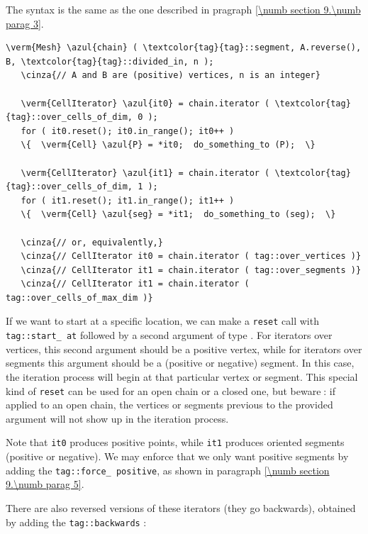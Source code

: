 The syntax is the same as the one described in pragraph \ref{\numb section 9.\numb parag 3}.

\begin{Verbatim}[commandchars=\\\{\},formatcom=\small\tt,
   baselinestretch=0.94,framesep=2mm                      ]
   \verm{Mesh} \azul{chain} ( \textcolor{tag}{tag}::segment, A.reverse(), B, \textcolor{tag}{tag}::divided_in, n );
   \cinza{// A and B are (positive) vertices, n is an integer}
   
   \verm{CellIterator} \azul{it0} = chain.iterator ( \textcolor{tag}{tag}::over_cells_of_dim, 0 );
   for ( it0.reset(); it0.in_range(); it0++ )
   \{  \verm{Cell} \azul{P} = *it0;  do_something_to (P);  \}

   \verm{CellIterator} \azul{it1} = chain.iterator ( \textcolor{tag}{tag}::over_cells_of_dim, 1 );
   for ( it1.reset(); it1.in_range(); it1++ )
   \{  \verm{Cell} \azul{seg} = *it1;  do_something_to (seg);  \}
   
   \cinza{// or, equivalently,}
   \cinza{// CellIterator it0 = chain.iterator ( tag::over_vertices )}
   \cinza{// CellIterator it1 = chain.iterator ( tag::over_segments )}
   \cinza{// CellIterator it1 = chain.iterator ( tag::over_cells_of_max_dim )}
\end{Verbatim}

If we want to start at a specific location, we can make a {\small\tt reset} call with
{\small\tt \textcolor{tag}{tag}::start\_\,at} followed by a second argument of type {\small\tt{}}.
For iterators over vertices, this second argument should be a positive vertex,
while for iterators over segments this argument should be a (positive or negative) segment.
In this case, the iteration process will begin at that particular vertex or segment.
This special kind of {\small\tt reset} can be used for an open chain or a closed one,
but beware$\;$: if applied to an open chain, the vertices or segments previous to the provided
argument will not show up in the iteration process.

Note that {\small\tt it0} produces positive points, while {\small\tt  it1} produces
oriented segments (positive or negative).
We may enforce that we only want positive segments by adding the
{\small\tt \textcolor{tag}{tag}::force\_\,positive}, as shown in paragraph \ref{\numb section 9.\numb parag 5}.

There are also reversed versions of these iterators (they go backwards), obtained by adding
the {\small\tt \textcolor{tag}{tag}::backwards} :

